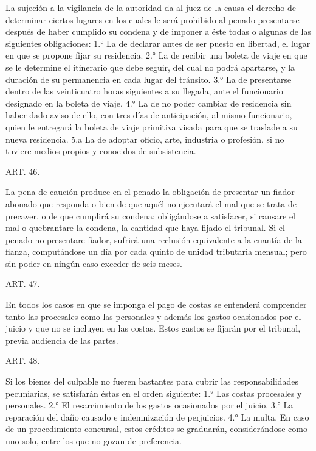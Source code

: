     La sujeción a la vigilancia de la autoridad da al juez de la causa el derecho de determinar ciertos lugares en los cuales le será prohibido al penado presentarse después de haber cumplido su condena y de imponer a éste todas o algunas de las siguientes obligaciones:
    1.° La de declarar antes de ser puesto en libertad, el lugar en que se propone fijar su residencia.
    2.° La de recibir una boleta de viaje en que se le determine el itinerario que debe seguir, del cual no podrá apartarse, y la duración de su permanencia en cada lugar del tránsito.
    3.° La de presentarse dentro de las veinticuatro horas siguientes a su llegada, ante el funcionario designado en la boleta de viaje.
    4.° La de no poder cambiar de residencia sin haber dado aviso de ello, con tres días de anticipación, al mismo funcionario, quien le entregará la boleta de viaje primitiva visada para que se traslade a su nueva residencia.
    5.a La de adoptar oficio, arte, industria o profesión, si no tuviere medios propios y conocidos de subsistencia.


    ART. 46.

    La pena de caución produce en el penado la obligación de presentar un fiador abonado que responda o bien de que aquél no ejecutará el mal que se trata de precaver, o de que cumplirá su condena; obligándose a satisfacer, si causare el mal o quebrantare la condena, la cantidad que haya fijado el tribunal.
    Si el penado no presentare fiador, sufrirá una reclusión equivalente a la cuantía de la fianza, computándose un día por cada quinto de unidad tributaria mensual; pero sin poder en ningún caso exceder de seis meses.





    ART. 47.

    En todos los casos en que se imponga el pago de costas se entenderá comprender tanto las procesales como las personales y además los gastos ocasionados por el juicio y que no se incluyen en las costas. Estos gastos se fijarán por el tribunal, previa audiencia de las partes.



    ART. 48.

    Si los bienes del culpable no fueren bastantes para cubrir las responsabilidades pecuniarias, se satisfarán éstas en el orden siguiente:
    1.° Las costas procesales y personales.
    2.° El resarcimiento de los gastos ocasionados por el juicio.
    3.° La reparación del daño causado e indemnización de perjuicios.
    4.° La multa.
    En caso de un procedimiento concursal, estos créditos se graduarán, considerándose como uno solo, entre los que no gozan de preferencia.



